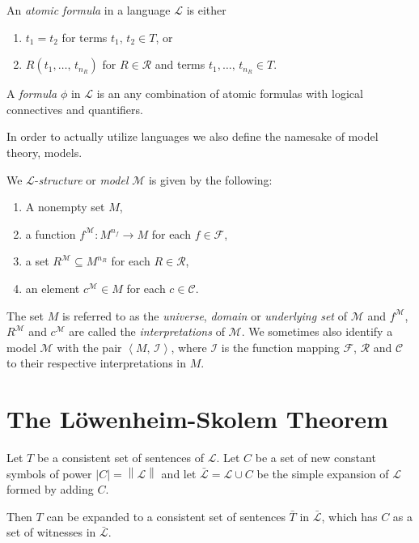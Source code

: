 \documentclass[../../main.tex]{subfiles}
\begin{document}
\begin{definition}
    An \textit{atomic formula} in a language $\mathcal{L}$ is either
    \begin{enumerate}
        \item $t_1 = t_2$ for terms $t_1,\, t_2 \in T$, or   
        \item $R(t_1,\ldots,\, t_{n_R})$ for $R \in \mathcal{R}$ and terms $t_1,\ldots,\, t_{n_R} \in T$.
    \end{enumerate}
    A \textit{formula} $\phi$ in $\mathcal{L}$ is an any combination of atomic formulas with logical connectives and quantifiers.
\end{definition}

In order to actually utilize languages we also define the namesake of model theory, models.

\begin{definition}\cite[Definition 1.1.2]{Mar02}
    We $\mathcal{L}$-\textit{structure} or \textit{model} $\mathcal{M}$ is given by the following:
    \begin{enumerate}
        \item A nonempty set $M$,
        \item a function $f^{\mathcal{M}}: M^{n_f} \to M$ for each $f \in \mathcal{F}$,
        \item a set $R^\mathcal{M} \subseteq M^{n_R}$ for each $R \in \mathcal{R}$,
        \item an element $c^\mathcal{M} \in M$ for each $c \in \mathcal{C}$.
    \end{enumerate}
    The set $M$ is referred to as the \textit{universe}, \textit{domain} or \textit{underlying set} of $\mathcal{M}$ 
    and $f^{\mathcal{M}}$, $R^{\mathcal{M}}$ and $c^{\mathcal{M}}$ are called the \textit{interpretations} of $\mathcal{M}$.
    We sometimes also identify a model $\mathcal{M}$ with the pair $\left<M,\, \mathcal{I}\right>$, 
    where $\mathcal{I}$ is the function mapping $\mathcal{F}$, $\mathcal{R}$ and $\mathcal{C}$ to their respective interpretations in $M$.
\end{definition}

\section{The Löwenheim-Skolem Theorem}

\begin{lemma}\cite[Lemma 2.1.1]{Cha90}
    Let $T$ be a consistent set of sentences of $\mathcal{L}$.  
    Let $C$ be a set of new constant symbols of power $\left\lvert C \right\rvert = \left\lVert \mathcal{L} \right\rVert$
     and let $\bar{\mathcal{L}} = \mathcal{L} \cup C$ be the simple expansion of $\mathcal{L}$ formed by adding $C$.
    
    Then $T$ can be expanded to a consistent set of sentences $\bar{T}$ in $\bar{\mathcal{L}}$, which has $C$ as a set of witnesses in $\bar{\mathcal{L}}$.
\end{lemma}
\end{document}

